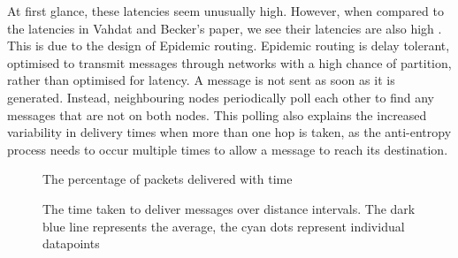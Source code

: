 \documentclass[12pt,a4paper]{report}
\begin{document}
At first glance, these latencies seem unusually high. However, when compared to the latencies in Vahdat and Becker's paper, we see their latencies are also high \cite{epidemic}. This is due to the design of Epidemic routing. Epidemic routing is delay tolerant, optimised to transmit messages through networks with a high chance of partition, rather than optimised for latency. A message is not sent as soon as it is generated. Instead, neighbouring nodes periodically poll each other to find any messages that are not on both nodes. This polling also explains the increased variability in delivery times when more than one hop is taken, as the anti-entropy process needs to occur multiple times to allow a message to reach its destination.
\begin{figure}[h]
\begin{center}

\end{center}
\caption{The percentage of packets delivered with time}
\end{figure}

\begin{figure}[h]
\begin{center}

\end{center}
\caption{The time taken to deliver messages over distance intervals. The dark blue line represents the average, the cyan dots represent individual datapoints}
\end{figure}
\begin{table}[h]
\begin{center}
\end{center}
\caption{Packet latency}
\end{table} 
\FloatBarrier
\end{document}
